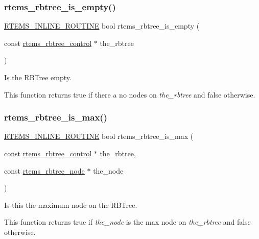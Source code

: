 \subsubsection{\texorpdfstring{rtems\_rbtree\_is\_empty()}{rtems\_rbtree\_is\_empty()}}
{\footnotesize\ttfamily \mbox{\hyperlink{group__RTEMSScoreBaseDefs_gac216239df231d5dbd15e3520b0b9313f}{R\+T\+E\+M\+S\+\_\+\+I\+N\+L\+I\+N\+E\+\_\+\+R\+O\+U\+T\+I\+NE}} bool rtems\+\_\+rbtree\+\_\+is\+\_\+empty (\begin{DoxyParamCaption}\item[{const \mbox{\hyperlink{group__ClassicRBTrees_ga21fe446d0b3cb8b25c814e93357753ef}{rtems\+\_\+rbtree\+\_\+control}} $\ast$}]{the\+\_\+rbtree }\end{DoxyParamCaption})}



Is the R\+B\+Tree empty. 

This function returns true if there a no nodes on {\itshape the\+\_\+rbtree} and false otherwise. \mbox{\label{group__ClassicRBTrees_ga100492e7f80d16061ce9f20616b1838c}} 
\subsubsection{\texorpdfstring{rtems\_rbtree\_is\_max()}{rtems\_rbtree\_is\_max()}}
{\footnotesize\ttfamily \mbox{\hyperlink{group__RTEMSScoreBaseDefs_gac216239df231d5dbd15e3520b0b9313f}{R\+T\+E\+M\+S\+\_\+\+I\+N\+L\+I\+N\+E\+\_\+\+R\+O\+U\+T\+I\+NE}} bool rtems\+\_\+rbtree\+\_\+is\+\_\+max (\begin{DoxyParamCaption}\item[{const \mbox{\hyperlink{group__ClassicRBTrees_ga21fe446d0b3cb8b25c814e93357753ef}{rtems\+\_\+rbtree\+\_\+control}} $\ast$}]{the\+\_\+rbtree,  }\item[{const \mbox{\hyperlink{group__ClassicRBTrees_gaef47fc7fc61856c9afbf7f18a26ff80d}{rtems\+\_\+rbtree\+\_\+node}} $\ast$}]{the\+\_\+node }\end{DoxyParamCaption})}



Is this the maximum node on the R\+B\+Tree. 

This function returns true if {\itshape the\+\_\+node} is the max node on {\itshape the\+\_\+rbtree} and false otherwise. \mbox{\label{group__ClassicRBTrees_gab52a8561fdde5d8722a156075963d9f7}} 

